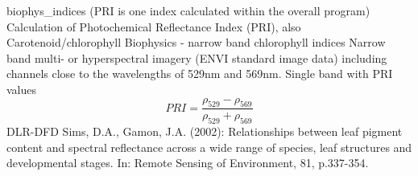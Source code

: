 %
{ %
biophys\_indices (PRI is one index calculated within the overall program)
}
%
{ %
Calculation of Photochemical Reflectance Index (PRI), also Carotenoid/chlorophyll
}
%
{ %
Biophysics - narrow band chlorophyll indices
}
%
{ %
Narrow band multi- or hyperspectral imagery (ENVI standard image data) including channels close to the wavelengths of 529nm and 569nm.\bigskip
}
%
{ %
Single band with PRI values
}
%
{ %
\begin{displaymath}
PRI = \frac{\rho_{529} -\rho_{569} } {\rho_{529} +\rho_{569} }
\end{displaymath}
}
%
{ %
DLR-DFD
}
%
{ %
Sims, D.A., Gamon, J.A. (2002): Relationships between leaf pigment content and spectral reflectance across a wide range of species, leaf structures and developmental stages. In: Remote Sensing of Environment, 81, p.337-354.
}

